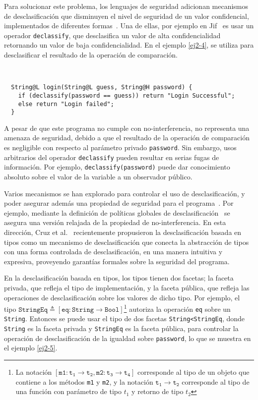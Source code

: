 Para solucionar este problema, los lenguajes de seguridad adicionan mecanismos de desclasificación que disminuyen el nivel de seguridad de un valor confidencial, implementados de diferentes formas~\cite{sabelfeldSands:JCS09}. Una de ellas, por ejemplo en Jif~\cite{jif} es usar un operador \texttt{declassify}, que desclasifica un valor de alta confidencialidad retornando un valor de baja confidencialidad. En el ejemplo \ref{ej2-4}, se utiliza para desclasificar el resultado de la operación de comparación.

\begin{ej} \ \\
  \normalfont
  \label{ej2-4}
\begin{lstlisting}
  String@L login(String@L guess, String@H password) {
    if (declassify(password == guess)) return "Login Successful";
    else return "Login failed";
  }
\end{lstlisting}
\end{ej}


A pesar de que este programa no cumple con no-interferencia, no representa una amenaza de seguridad, debido a que el resultado de la operación de comparación es negligible con respecto al parámetro privado \texttt{password}. Sin embargo, usos arbitrarios del operador \texttt{declassify} pueden resultar en serias fugas de información. Por ejemplo, \texttt{declassify(password)} puede dar conocimiento absoluto sobre el valor de la variable a un observador público.

Varios mecanismos se han explorado para controlar el uso de desclasificación, y poder asegurar además una propiedad de seguridad para el programa~\cite{sabelfeldSands:JCS09}. Por ejemplo, mediante la definición de políticas globales de desclasificación~\cite{liZdancewic:POPL05} se asegura una versión relajada de la propiedad de no-interferencia. En esta dirección, Cruz et al.~\cite{cruzAl:ecoop2017} recientemente propusieron la desclasificación basada en tipos como un mecanismo de desclasificación que conecta la abstracción de tipos con una forma controlada de desclasificación, en una manera intuitiva y expresiva, proveyendo garantías formales sobre la seguridad del programa.

En la desclasificación basada en tipos, los tipos tienen dos facetas; la faceta privada, que refleja el tipo de implementación, y la faceta pública, que refleja las operaciones de desclasificación sobre los valores de dicho tipo. Por ejemplo, el tipo $\mathtt{StringEq} \triangleq [\mathtt{eq} : \mathtt{String} \rightarrow \mathtt{Bool}]$\footnote{La notación $[\mathtt{m1} : \mathtt{t_1} \rightarrow \mathtt{t_2}, \mathtt{m2} : \mathtt{t_3} \rightarrow \mathtt{t_4}]$ corresponde al tipo de un objeto que contiene a los métodos \texttt{m1} y \texttt{m2}, y la notación $\mathtt{t_1} \rightarrow \mathtt{t_2}$ corresponde al tipo de una función con parámetro de tipo $t_1$ y retorno de tipo $t_2$} autoriza la operación \texttt{eq} sobre un \texttt{String}. Entonces se puede usar el tipo de dos facetas \texttt{String<StringEq}, donde \texttt{String} es la faceta privada y \texttt{StringEq} es la faceta pública, para controlar la operación de desclasificación de la igualdad sobre \texttt{password}, lo que se muestra en el ejemplo \ref{ej2-5}.

